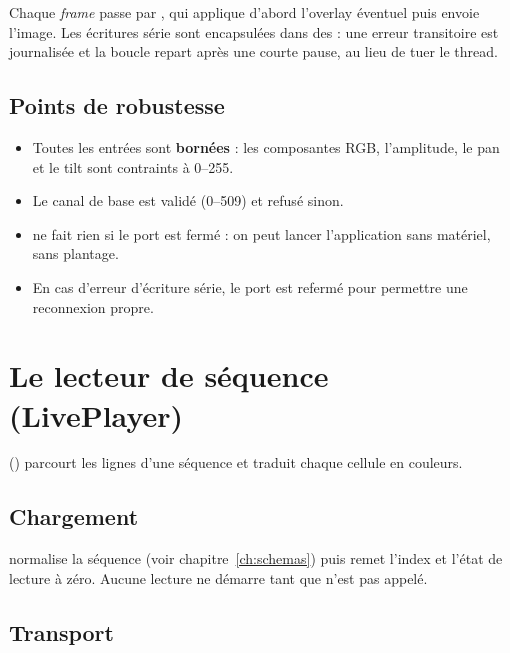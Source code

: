 Chaque \emph{frame} passe par , qui applique
d'abord l'overlay éventuel puis envoie l'image. Les écritures série sont
encapsulées dans des  : une erreur transitoire est journalisée
et la boucle repart après une courte pause, au lieu de tuer le thread.

\section{Points de robustesse}

\begin{itemize}[leftmargin=1.4em]
  \item Toutes les entrées sont \textbf{bornées} : les composantes RGB,
        l'amplitude, le pan et le tilt sont contraints à 0--255.
  \item Le canal de base est validé (0--509) et refusé sinon.
  \item {} ne fait rien si le port est fermé : on
        peut lancer l'application sans matériel, sans plantage.
  \item En cas d'erreur d'écriture série, le port est refermé pour permettre une
        reconnexion propre.
\end{itemize}

\chapter{Le lecteur de séquence (LivePlayer)}
\label{ch:liveplayer}

 () parcourt les lignes d'une
séquence et traduit chaque cellule en couleurs.

\section{Chargement}

 normalise la séquence (voir chapitre~\ref{ch:schemas}) puis
remet l'index et l'état de lecture à zéro. Aucune lecture ne démarre tant que
 n'est pas appelé.

\section{Transport}

